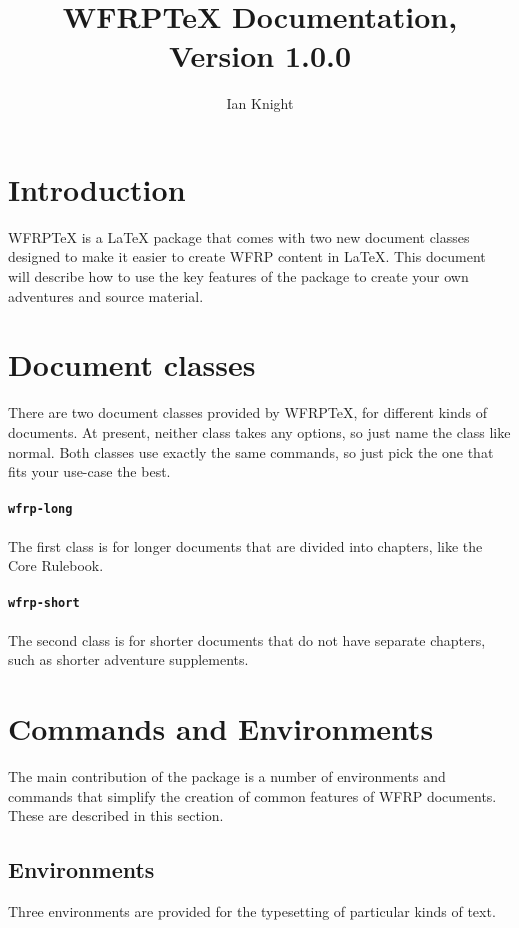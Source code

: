 \documentclass[10pt,a4paper]{article}
\title{WFRP\TeX{} Documentation, Version 1.0.0}
\author{Ian Knight}
\date{}
\begin{document}
\maketitle
\tableofcontents

\section{Introduction}
WFRP\TeX{} is a \LaTeX{} package that comes with two new document classes
designed to make it easier to create WFRP content in \LaTeX{}. This document
will describe how to use the key features of the package to create your
own adventures and source material.


\section{Document classes}
There are two document classes provided by WFRP\TeX{}, for different kinds
of documents. At present, neither class takes any options, so just name the
class like normal. Both classes use exactly the same commands, so just pick
the one that fits your use-case the best.

\paragraph{\texttt{wfrp-long}} The first class is for longer documents that
are divided into chapters, like the Core Rulebook.

\paragraph{\texttt{wfrp-short}} The second class is for shorter documents
that do not have separate chapters, such as shorter adventure supplements.


\section{Commands and Environments}
The main contribution of the package is a number of environments and
commands that simplify the creation of common features of WFRP documents.
These are described in this section.

\subsection{Environments}
Three environments are provided for the typesetting of particular kinds
of text.
\end{document}
